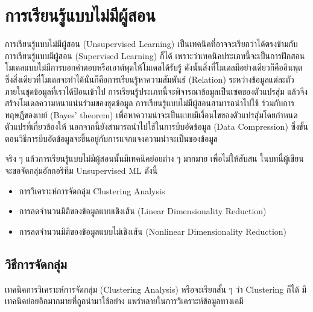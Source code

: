 

\chapter{การเรียนรู้แบบไม่มีผู้สอน}
\label{ch:unsup_ml}

การเรียนรู้แบบไม่มีผู้สอน (Unsupervised Learning) เป็นเทคนิคที่อาจจะเรียกว่าได้ตรงข้ามกับการเรียนรู้แบบมีผู้สอน (Supervised Learning) 
ก็ได้ เพราะว่าเทคนิคประเภทนี้จะเป็นการฝึกสอนโมเดลแบบไม่มีการบอกคำตอบหรือเอาต์พุตให้โมเดลได้รับรู้ ดังนั้นสิ่งที่โมเดลมีอย่างเดียวก็คืออินพุต
ซึ่งสิ่งเดียวที่โมเดลจะทำได้นั่นก็คือการเรียนรู้หาความสัมพันธ์ (Relation) ระหว่างข้อมูลแต่ละตัวภายในชุดข้อมูลที่เราได้ป้อนเข้าไป 
การเรียนรู้ประเภทนี้จะพิจารณาข้อมูลเป็นเซตของตัวแปรสุ่ม แล้วจึงสร้างโมเดลความหนาแน่นร่วมของชุดข้อมูล การเรียนรู้แบบไม่มีผู้สอนสามารถนำไปใช้%
ร่วมกับการทฤษฎีของเบย์ (Bayes' theorem) เพื่อหาความน่าจะเป็นแบบมีเงื่อนไขของตัวแปรสุ่มโดยกำหนดตัวแปรที่เกี่ยวข้องให้ 
นอกจากนี้ยังสามารถนำไปใช้ในการบีบอัดข้อมูล (Data Compression) ซึ่งขั้นตอนวิธีการบีบอัดข้อมูลจะขึ้นอยู่กับการแจกแจงความน่าจะเป็นของข้อมูล

จริง ๆ แล้วการเรียนรู้แบบไม่มีผู้สอนนั้นมีเทคนิคย่อยต่าง ๆ มากมาย เพื่อไม่ให้สับสน ในบทนี้ผู้เขียนจะขอจัดกลุ่มอัลกอริทึม Unsupervised ML ดังนี้

\begin{itemize}
    \item การวิเคราะห์การจัดกลุ่ม Clustering Analysis
    \item การลดจำนวนมิติของข้อมูลแบบเชิงเส้น (Linear Dimensionality Reduction)
    \item การลดจำนวนมิติของข้อมูลแบบไม่เชิงเส้น (Nonlinear Dimensionality Reduction)
\end{itemize}

\section{วิธีการจัดกลุ่ม}
\label{sec:clustering}

เทคนิคการวิเคราะห์การจัดกลุ่ม (Clustering Analysis) หรือจะเรียกสั้น ๆ ว่า Clustering ก็ได้ มีเทคนิคย่อยอีกมากมายที่ถูกนำมาใช้อย่าง%
แพร่หลายในการวิเคราะห์ข้อมูลทางเคมี

